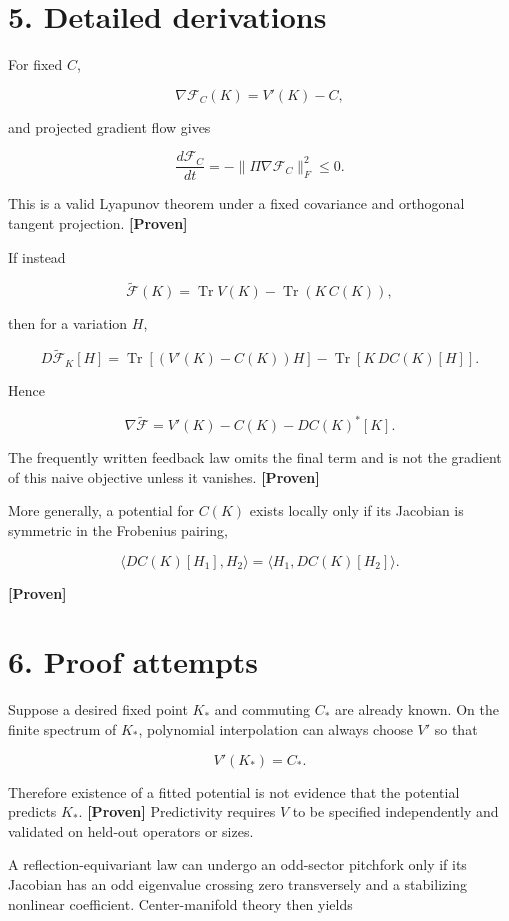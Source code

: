 \documentclass[11pt,a4paper,openany]{report}
\newcommand{\statusProven}{\textcolor{fingreen}{[Proven]}}
\begin{document}
\section{5. Detailed derivations}

For fixed \(C\),

\[
\nabla\mathcal F_C(K)=V'(K)-C,
\]

and projected gradient flow gives

\[
\frac{d\mathcal F_C}{dt}
=-\|\Pi\nabla\mathcal F_C\|_F^2\le0.
\]

This is a valid Lyapunov theorem under a fixed covariance and orthogonal tangent projection. \textbf{\statusProven{}}

If instead

\[
\widetilde{\mathcal F}(K)
=\operatorname{Tr}V(K)-\operatorname{Tr}(K\,C(K)),
\]

then for a variation \(H\),

\[
D\widetilde{\mathcal F}_K[H]
=\operatorname{Tr}\!\left[(V'(K)-C(K))H\right]
-\operatorname{Tr}\!\left[K\,DC(K)[H]\right].
\]

Hence

\[
\nabla\widetilde{\mathcal F}
=V'(K)-C(K)-DC(K)^*[K].
\]

The frequently written feedback law omits the final term and is not the gradient of this naive objective unless it vanishes. \textbf{\statusProven{}}

More generally, a potential for \(C(K)\) exists locally only if its Jacobian is symmetric in the Frobenius pairing,

\[
\langle DC(K)[H_1],H_2\rangle
=\langle H_1,DC(K)[H_2]\rangle.
\]

\textbf{\statusProven{}}

\section{6. Proof attempts}

Suppose a desired fixed point \(K_*\) and commuting \(C_*\) are already known. On the finite spectrum of \(K_*\), polynomial interpolation can always choose \(V'\) so that

\[
V'(K_*)=C_*.
\]

Therefore existence of a fitted potential is not evidence that the potential predicts \(K_*\). \textbf{\statusProven{}} Predictivity requires \(V\) to be specified independently and validated on held-out operators or sizes.

A reflection-equivariant law can undergo an odd-sector pitchfork only if its Jacobian has an odd eigenvalue crossing zero transversely and a stabilizing nonlinear coefficient. Center-manifold theory then yields
\end{document}
